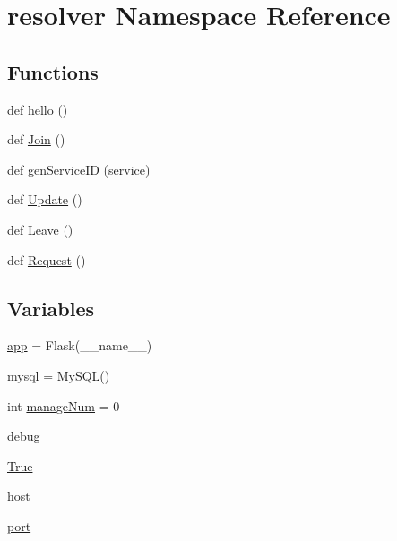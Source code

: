 \hypertarget{namespaceresolver}{}\section{resolver Namespace Reference}
\label{namespaceresolver}
\subsection*{Functions}
\begin{DoxyCompactItemize}
\item 
def \hyperlink{namespaceresolver_a1140d278a5c35789882373da0b92a70f}{hello} ()
\item 
def \hyperlink{namespaceresolver_ae73717d746c6caacbafe7321b15dda9b}{Join} ()
\item 
def \hyperlink{namespaceresolver_a957fa297a9097320b9cd8937dadbf652}{gen\+Service\+ID} (service)
\item 
def \hyperlink{namespaceresolver_a45170bdd8d316402bbe613ff1b8c51ab}{Update} ()
\item 
def \hyperlink{namespaceresolver_aa4780fe1bbe4c9d81a5d6b0a8da80c67}{Leave} ()
\item 
def \hyperlink{namespaceresolver_ab5959a2deb7f2a47b7989869f51cc195}{Request} ()
\end{DoxyCompactItemize}
\subsection*{Variables}
\begin{DoxyCompactItemize}
\item 
\hyperlink{namespaceresolver_adb1e83207a6480acc50fa5fa48a18f1f}{app} = Flask(\+\_\+\+\_\+name\+\_\+\+\_\+)
\item 
\hyperlink{namespaceresolver_a10ef240d2a54598eb117583eb988d7a0}{mysql} = My\+S\+QL()
\item 
int \hyperlink{namespaceresolver_abbd2d893972ece6f8217fa2024fef452}{manage\+Num} = 0
\item 
\hyperlink{namespaceresolver_ac1fce85dfd75742653eeab4c331251df}{debug}
\item 
\hyperlink{namespaceresolver_acca8a77f0c74712e5a2bb27dbd5301cd}{True}
\item 
\hyperlink{namespaceresolver_a0bafee2c5718d0808d281116fd40f3f6}{host}
\item 
\hyperlink{namespaceresolver_a65e246f56606051159492a0dcbc33ab4}{port}
\end{DoxyCompactItemize}


